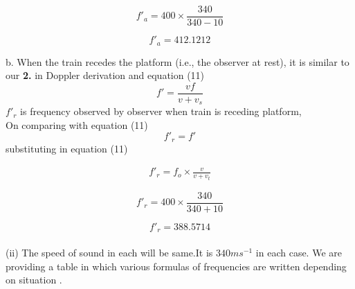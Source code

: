\documentclass[journal,12pt,twocolumn]{IEEEtran}
\theoremstyle{remark}
\begin{document}
$$f'_a=400\times\frac{340}{340-10}$$

$$f'_a=412.1212$$
\bigskip

b. When the train recedes the platform (i.e., the observer at rest), it is similar to our \textbf{2.} in Doppler derivation and equation (11)
$$f' = \frac{v f}{v+ v_s }$$
$f'_r $ is frequency observed by observer when train is receding platform,\\
On comparing with equation (11) 
$$f'_r =f'$$
substituting in equation (11)
\bigskip
    \begin{table}[h]
   
        
       
    \end{table}
    \newpage
    
\begin{align}f'_r=f_o\times\frac{v}{v+v_t}\end{align}

$$f'_r=400\times\frac{340}{340+10}$$

$$f'_r=388.5714$$\\
(ii) The speed of sound in each will be same.It is $340  ms^{-1}$ in each case.
We are providing a table in which various formulas of frequencies are written depending on situation .\\\\


  
\end{document}

